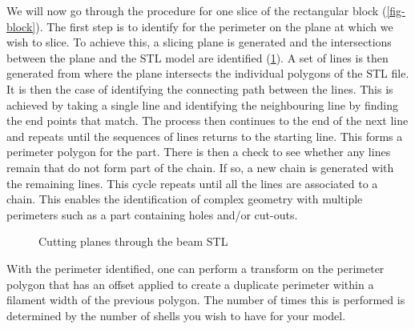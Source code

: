 We will now go through the procedure for one slice of the rectangular block (\cref{fig-block}). The first step is to identify for the perimeter on the plane at which we wish to slice. To achieve this, a slicing plane is generated and the intersections between the plane and the \ac{STL} model are identified (\cref{fig-intersection}). A set of lines is then generated from where the plane intersects the individual polygons of the \ac{STL} file. It is then the case of identifying the connecting path between the lines. This is achieved by taking a single line and identifying the neighbouring line by finding the end points that match. The process then continues to the end of the next line and repeats until the sequences of lines returns to the starting line. This forms a perimeter polygon for the part. There is then a check to see whether any lines remain that do not form part of the chain. If so, a new chain is generated with the remaining lines. This cycle repeats until all the lines are associated to a chain. This enables the identification of complex geometry with multiple perimeters such as a part containing holes and/or cut-outs.

\begin{figure}[h!]
  \center
  \caption{Cutting planes through the beam STL}
  \label{fig-intersection}
\end{figure}


With the perimeter identified, one can perform a transform on the perimeter polygon that has an offset applied to create a duplicate perimeter within a filament width of the previous polygon. The number of times this is performed is determined by the number of shells you wish to have for your model.


